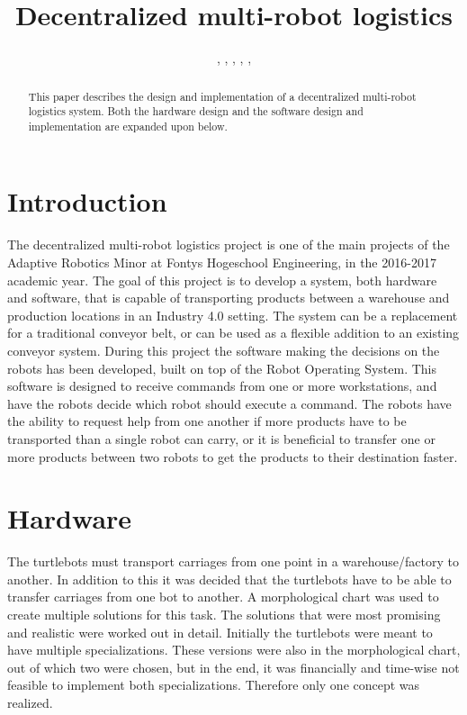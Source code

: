 \documentclass[10pt, journal]{IEEEtran}
\author{\IEEEauthorblockN{Remco Aarts}, 
 \IEEEauthorblockN{Jeroen van den Akker}, 
 \IEEEauthorblockN{Robert Delmaar}, 
 \IEEEauthorblockN{Bas Janssen},
 \IEEEauthorblockN{Addie Perenboom},
 \IEEEauthorblockN{Dimitri Waard}
 \IEEEauthorblockA{\\Minor Adaptive Robotics,
Fontys University of Applied Sciences\\
Eindhoven\\
Email: smh.janssen@student.fontys.nl}}
\title{Decentralized multi-robot logistics}
\begin{document}
\maketitle

\begin{abstract}
This paper describes the design and implementation of a decentralized multi-robot logistics system. Both the hardware design and the software design and implementation are expanded upon below.
\end{abstract}
\begin{IEEEkeywords}

\end{IEEEkeywords}

\section{Introduction}
The decentralized multi-robot logistics project is one of the main projects of the Adaptive Robotics Minor at Fontys Hogeschool Engineering, in the 2016-2017 academic year. The goal of this project is to develop a system, both hardware and software, that is capable of transporting products between a warehouse and production locations in an Industry 4.0 setting. The system can be a replacement for a traditional conveyor belt, or can be used as a flexible addition to an existing conveyor system.
During this project the software making the decisions on the robots has been developed, built on top of the Robot Operating System\cite{ROS}. This software is designed to receive commands from one or more workstations, and have the robots decide which robot should execute a command. The robots have the ability to request help from one another if more products have to be transported than a single robot can carry, or it is beneficial to transfer one or more products between two robots to get the products to their destination faster.

\section{Hardware}
The turtlebots must transport carriages from one point in a warehouse/factory to another. In addition to this it was decided that the turtlebots have to be able to transfer carriages from one bot to another. A morphological chart was used to create multiple solutions for this task. The solutions that were most promising and realistic were worked out in detail. Initially the turtlebots were meant to have multiple specializations. These versions were also in the morphological chart, out of which two were chosen, but in the end, it was financially and time-wise not feasible to implement both specializations. Therefore only one concept was realized.
\end{document}

